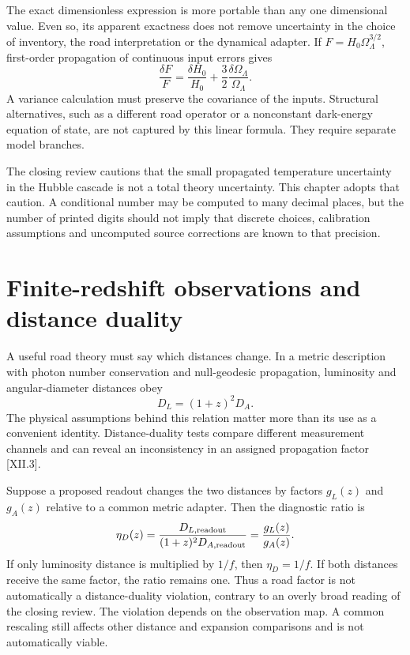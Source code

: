 The exact dimensionless expression is more portable than any one dimensional value. Even so, its apparent exactness does not remove uncertainty in the choice of inventory, the road interpretation or the dynamical adapter. If $F=H_0\Omega_\Lambda^{3/2}$, first-order propagation of continuous input errors gives
\begin{equation}
 \frac{\delta F}{F}=\frac{\delta H_0}{H_0}
                  +\frac32\frac{\delta\Omega_\Lambda}{\Omega_\Lambda}.
 \label{c12:errorlinear}
\end{equation}
A variance calculation must preserve the covariance of the inputs. Structural alternatives, such as a different road operator or a nonconstant dark-energy equation of state, are not captured by this linear formula. They require separate model branches.

The closing review cautions that the small propagated temperature uncertainty in the Hubble cascade is not a total theory uncertainty. This chapter adopts that caution. A conditional number may be computed to many decimal places, but the number of printed digits should not imply that discrete choices, calibration assumptions and uncomputed source corrections are known to that precision.

\section{Finite-redshift observations and distance duality}
A useful road theory must say which distances change. In a metric description with photon number conservation and null-geodesic propagation, luminosity and angular-diameter distances obey
\begin{equation}
 D_L=(1+z)^2D_A.
 \label{c12:duality}
\end{equation}
The physical assumptions behind this relation matter more than its use as a convenient identity. Distance-duality tests compare different measurement channels and can reveal an inconsistency in an assigned propagation factor [XII.3].

Suppose a proposed readout changes the two distances by factors $g_L(z)$ and $g_A(z)$ relative to a common metric adapter. Then the diagnostic ratio is
\begin{equation}
 \eta_D(z)=\frac{D_{L,\rm readout}}{(1+z)^2D_{A,\rm readout}}
          =\frac{g_L(z)}{g_A(z)}.
 \label{c12:dualityratio}
\end{equation}
If only luminosity distance is multiplied by $1/f$, then $\eta_D=1/f$. If both distances receive the same factor, the ratio remains one. Thus a road factor is not automatically a distance-duality violation, contrary to an overly broad reading of the closing review. The violation depends on the observation map. A common rescaling still affects other distance and expansion comparisons and is not automatically viable.

